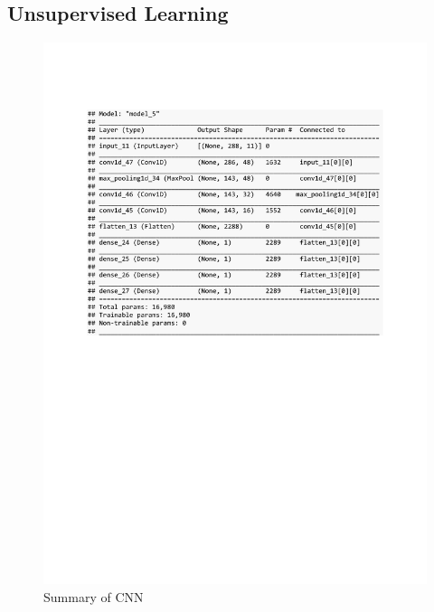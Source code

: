 \subsection{Unsupervised Learning}
\begin{figure}[h]
	\centering
	\includegraphics[scale=0.5]{Figures/summary_CNN_pred_house_temp}
	\decoRule
	\caption[Experiment 2: Summary of CNN for unsupervised learning]{Summary of CNN \parencite{own}}
	\label{fig:summary_CNN_pred_house_temp}
\end{figure}


